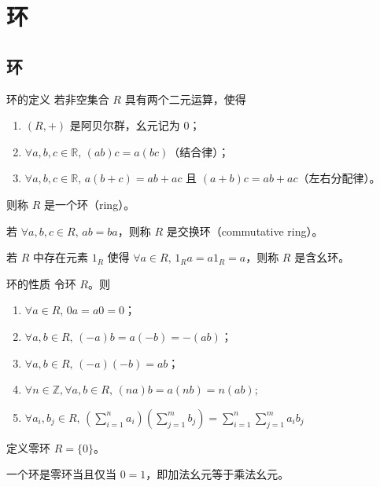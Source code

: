 \chapter{环}


\section{环}

\begin{definition}{环的定义}
  若非空集合 $R$ 具有两个二元运算，使得
  \begin{enumerate}
    \item $(R,+)$ 是阿贝尔群，幺元记为 $0$；
    \item $\forall a,b,c \in \mathbb{R},\, (ab)c = a(bc)$（结合律）；
    \item $\forall a,b,c \in \mathbb{R},\, a(b + c) = ab + ac$ 且 $(a + b)c = ab + ac$（左右分配律）。
  \end{enumerate}
  则称 $R$ 是一个环（ring）。

  若 $\forall a,b,c \in R,\, ab = ba$，则称 $R$ 是交换环（commutative ring）。

  若 $R$ 中存在元素 $1_R$ 使得 $\forall a \in R,\, 1_{R}a = a1_R = a$，则称 $R$ 是含幺环。
\end{definition}

\begin{theorem}{环的性质}
  令环 $R$。则
  \begin{enumerate}
    \item $\forall a \in R,\, 0a = a0 = 0$；
    \item $\forall a,b \in R,\, (-a)b = a(-b) = -(ab)$；
    \item $\forall a,b \in R,\, (-a)(-b) = ab$；
    \item $\forall n \in \mathbb{Z},\forall a,b \in R,\, (na)b = a(nb) = n(ab)$;
    \item $\forall a_i,b_j \in R,\,\displaystyle \left( \sum_{i = 1}^{n}a_i \right)\left( \sum_{j = 1}^{m}b_j \right) = \sum_{i = 1}^{n}\sum_{j = 1}^{m}a_{i}b_{j}$
  \end{enumerate}
\end{theorem}

\begin{definition}
  定义零环 $R = \{0\}$。
\end{definition}

\begin{proposition}
  一个环是零环当且仅当 $0 = 1$，即加法幺元等于乘法幺元。
\end{proposition}

